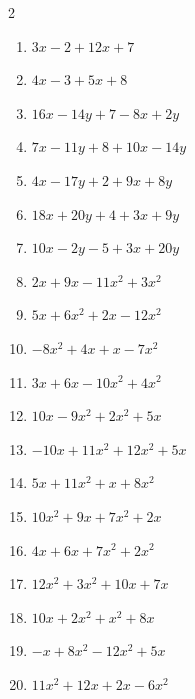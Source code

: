 \documentclass[11pt]{article}
\begin{document}
\begin{multicols}{2}
\begin{enumerate}
  \vspace{1.1cm}
  \item $3x - 2 + 12x + 7$
  \vspace{1.1cm}
  \item $4x - 3 + 5x + 8$
  \vspace{1.1cm}
  \item $16x - 14y + 7 - 8x + 2y$
  \vspace{1.1cm}
  \item $7x - 11y + 8 + 10x - 14y$
  \vspace{1.1cm}
  \item $4x - 17y + 2 + 9x + 8y$
  \vspace{1.1cm}
  \item $18x + 20y + 4 + 3x + 9y$
  \vspace{1.1cm}
  \item $10x - 2y - 5 + 3x + 20y$
  \vspace{1.1cm}
  \item $2x + 9x - 11x^{2} + 3x^{2}$
  \vspace{1.1cm}
  \item $5x + 6x^{2} + 2x - 12x^{2}$
  \vspace{1.1cm}
  \item $-8x^{2} + 4x + x - 7x^{2}$
  \vspace{1.1cm}
  \item $3x + 6x - 10x^{2} + 4x^{2}$
  \vspace{1.1cm}
  \item $10x - 9x^{2} + 2x^{2} + 5x$
  \vspace{1.1cm}
  \item $-10x + 11x^{2} + 12x^{2} + 5x$
  \vspace{1.1cm}
  \item $5x + 11x^{2} + x + 8x^{2}$
  \vspace{1.1cm}
  \item $10x^{2} + 9x + 7x^{2} + 2x$
  \vspace{1.1cm}
  \item $4x + 6x + 7x^{2} + 2x^{2}$
  \vspace{1.1cm}
  \item $12x^{2} + 3x^{2} + 10x + 7x$
  \vspace{1.1cm}
  \item $10x + 2x^{2} + x^{2} + 8x$
  \vspace{1.1cm}
  \item $-x + 8x^{2} - 12x^{2} + 5x$
  \vspace{1.1cm}
  \item $11x^{2} + 12x + 2x - 6x^{2}$

\end{enumerate}
\end{multicols}
\end{document}
